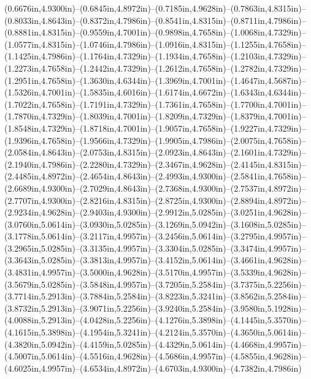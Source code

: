 (0.6676in,4.9300in)--(0.6845in,4.8972in)--(0.7185in,4.9628in)--(0.7863in,4.8315in)--(0.8033in,4.8643in)--(0.8372in,4.7986in)--(0.8541in,4.8315in)--(0.8711in,4.7986in)--(0.8881in,4.8315in)--(0.9559in,4.7001in)--(0.9898in,4.7658in)--(1.0068in,4.7329in)--(1.0577in,4.8315in)--(1.0746in,4.7986in)--(1.0916in,4.8315in)--(1.1255in,4.7658in)--(1.1425in,4.7986in)--(1.1764in,4.7329in)--(1.1934in,4.7658in)--(1.2103in,4.7329in)--(1.2273in,4.7658in)--(1.2442in,4.7329in)--(1.2612in,4.7658in)--(1.2782in,4.7329in)--(1.2951in,4.7658in)--(1.3630in,4.6344in)--(1.3969in,4.7001in)--(1.4647in,4.5687in)--(1.5326in,4.7001in)--(1.5835in,4.6016in)--(1.6174in,4.6672in)--(1.6343in,4.6344in)--(1.7022in,4.7658in)--(1.7191in,4.7329in)--(1.7361in,4.7658in)--(1.7700in,4.7001in)--(1.7870in,4.7329in)--(1.8039in,4.7001in)--(1.8209in,4.7329in)--(1.8379in,4.7001in)--(1.8548in,4.7329in)--(1.8718in,4.7001in)--(1.9057in,4.7658in)--(1.9227in,4.7329in)--(1.9396in,4.7658in)--(1.9566in,4.7329in)--(1.9905in,4.7986in)--(2.0075in,4.7658in)--(2.0584in,4.8643in)--(2.0753in,4.8315in)--(2.0923in,4.8643in)--(2.1601in,4.7329in)--(2.1940in,4.7986in)--(2.2280in,4.7329in)--(2.3467in,4.9628in)--(2.4145in,4.8315in)--(2.4485in,4.8972in)--(2.4654in,4.8643in)--(2.4993in,4.9300in)--(2.5841in,4.7658in)--(2.6689in,4.9300in)--(2.7029in,4.8643in)--(2.7368in,4.9300in)--(2.7537in,4.8972in)--(2.7707in,4.9300in)--(2.8216in,4.8315in)--(2.8725in,4.9300in)--(2.8894in,4.8972in)--(2.9234in,4.9628in)--(2.9403in,4.9300in)--(2.9912in,5.0285in)--(3.0251in,4.9628in)--(3.0760in,5.0614in)--(3.0930in,5.0285in)--(3.1269in,5.0942in)--(3.1608in,5.0285in)--(3.1778in,5.0614in)--(3.2117in,4.9957in)--(3.2456in,5.0614in)--(3.2795in,4.9957in)--(3.2965in,5.0285in)--(3.3135in,4.9957in)--(3.3304in,5.0285in)--(3.3474in,4.9957in)--(3.3643in,5.0285in)--(3.3813in,4.9957in)--(3.4152in,5.0614in)--(3.4661in,4.9628in)--(3.4831in,4.9957in)--(3.5000in,4.9628in)--(3.5170in,4.9957in)--(3.5339in,4.9628in)--(3.5679in,5.0285in)--(3.5848in,4.9957in)--(3.7205in,5.2584in)--(3.7375in,5.2256in)--(3.7714in,5.2913in)--(3.7884in,5.2584in)--(3.8223in,5.3241in)--(3.8562in,5.2584in)--(3.8732in,5.2913in)--(3.9071in,5.2256in)--(3.9240in,5.2584in)--(3.9580in,5.1928in)--(4.0088in,5.2913in)--(4.0428in,5.2256in)--(4.1276in,5.3898in)--(4.1445in,5.3570in)--(4.1615in,5.3898in)--(4.1954in,5.3241in)--(4.2124in,5.3570in)--(4.3650in,5.0614in)--(4.3820in,5.0942in)--(4.4159in,5.0285in)--(4.4329in,5.0614in)--(4.4668in,4.9957in)--(4.5007in,5.0614in)--(4.5516in,4.9628in)--(4.5686in,4.9957in)--(4.5855in,4.9628in)--(4.6025in,4.9957in)--(4.6534in,4.8972in)--(4.6703in,4.9300in)--(4.7382in,4.7986in) 